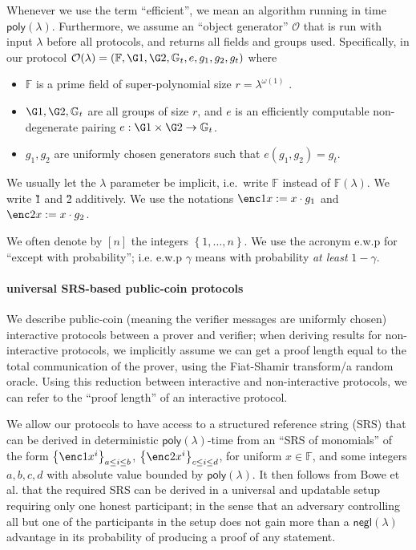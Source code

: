 \documentclass[11pt]{article} %
\newcommand{\Gt}{\ensuremath{{\mathbb G}_t}\xspace}
\newcommand{\F}{\ensuremath{\mathbb F}\xspace}
\newcommand{\negl}{\ensuremath{\mathsf{negl}(\lambda)}\xspace}
\newcommand{\defeq}{:=}
\newcommand{\sett}[2]{\ensuremath{\set{#1}_{#2}}\xspace}
\newcommand{\set}[1]{\ensuremath{\left\{#1\right\}}\xspace}
\newcommand{\obgen}{\ensuremath{\mathcal O}\xspace}
\newcommand{\poly}{\ensuremath{\mathsf{poly(\lambda)}}\xspace}
\begin{document}
Whenever we use the term “efficient”, we mean an algorithm running in time \poly. Furthermore,
we assume an “object generator” \obgen that is run with input $\lambda$ before all protocols, and returns all fields and groups used. Specifically, in our protocol $\obgen(\lambda) = (\F, \G1, \G2, \Gt, e, g_1, g_2,g_t)$ where
\begin{itemize}
\item \F is a prime field of super-polynomial size $r = \lambda^{\omega(1)}$
.
\item $\G1,\G2,\Gt$ are all groups of size $r$, and $e$ is an efficiently computable non-degenerate pairing
$e : \G1 \times \G2 \to \Gt$.
\item $g_1,g_2$ are uniformly chosen generators such that $e(g_1, g_2) = g_t$.
\end{itemize}
We usually let the $\lambda$ parameter be implicit, i.e.\ write \F instead of $\F(\lambda)$.
We write \G1 and \G2 additively. We use the notations $\enc1{x}\defeq x\cdot g_1$ and $\enc2{x}\defeq x\cdot g_2$.

We often denote by $[n]$ the integers \set{1,\ldots,n}.
We use the acronym e.w.p for ``except with probability''; i.e. e.w.p $\gamma$ means with probability \emph{at least} $1-\gamma$.

\paragraph{universal SRS-based public-coin protocols}
We describe public-coin (meaning the verifier messages are uniformly chosen) interactive protocols between a prover and verifier; when deriving results for non-interactive protocols, we implicitly assume we can get a proof length equal to the total communication of the prover, using the Fiat-Shamir transform/a random oracle. Using this reduction between interactive and non-interactive protocols, we can refer to the ``proof length'' of an interactive protocol. 

We allow our protocols to have access to a structured reference string (SRS) that can be derived in deterministic \poly-time from an ``SRS of monomials'' of the form
\sett{\enc1{x^i}}{a\leq i \leq b}, \sett{\enc2{x^i}}{c\leq i \leq d}, for uniform $x\in \F$,
and some integers $a,b,c,d$ with absolute value bounded by \poly.
It then follows from Bowe et al. \cite{SecondMPC} that the required SRS can be derived in a universal and updatable setup requiring only one honest participant; in the sense that an adversary controlling all but one of the participants in the setup does not gain more than a \negl advantage in its probability of producing a proof of any statement.
\end{document}
